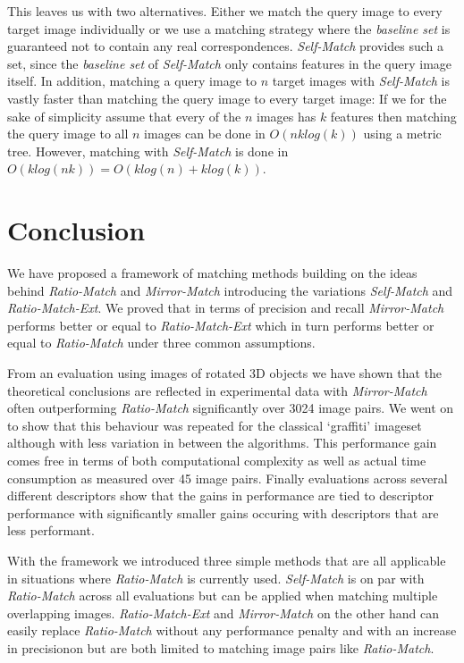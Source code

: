 \documentclass[journal]{IEEEtran}
\begin{document}
This leaves us with two alternatives. Either we match the query image to 
every target image individually or we use a matching strategy where the 
\emph{baseline set} is guaranteed not to contain any real 
correspondences. \emph{Self-Match} provides such a set, since the 
\emph{baseline set} of \emph{Self-Match} only contains features in the 
query image itself. In addition, matching a query image to $n$ target 
images with \emph{Self-Match} is vastly faster than matching the query 
image to every target image: If we for the sake of simplicity assume 
that every of the $n$ images has $k$ features then matching the query 
image to all $n$ images can be done in $O(nklog(k))$ using a metric 
tree. However, matching with \emph{Self-Match} is done in $O(klog(nk)) =
O(klog(n) + klog(k))$.

\section{Conclusion}
\label{S:Summary}

We have proposed a framework of matching methods building on the ideas 
behind \emph{Ratio-Match} and \emph{Mirror-Match} introducing the 
variations \emph{Self-Match} and \emph{Ratio-Match-Ext}. We proved that 
in terms of precision and recall \emph{Mirror-Match} performs better or 
equal to \emph{Ratio-Match-Ext} which in turn performs better or equal 
to \emph{Ratio-Match} under three common assumptions.

From an evaluation using images of rotated 3D objects we have shown that
the theoretical conclusions are reflected in experimental data with 
\emph{Mirror-Match} often outperforming \emph{Ratio-Match}
significantly over 3024 image pairs. We went on to show that this 
behaviour was repeated for the classical `graffiti' imageset although 
with less variation in between the algorithms. This performance gain 
comes free in terms of both computational complexity as well as actual 
time consumption as measured over 45 image pairs. Finally evaluations 
across several different descriptors show that the gains in performance 
are tied to descriptor performance with significantly smaller gains 
occuring with descriptors that are less performant.

With the framework we introduced three simple methods that are all 
applicable in situations where \emph{Ratio-Match} is currently used.  
\emph{Self-Match} is on par with \emph{Ratio-Match} across all 
evaluations but can be applied when matching multiple overlapping 
images. \emph{Ratio-Match-Ext} and \emph{Mirror-Match} on the other hand 
can easily replace \emph{Ratio-Match} without any performance penalty 
and with an increase in precisionon but are both limited to matching 
image pairs like \emph{Ratio-Match}.



\end{document}
